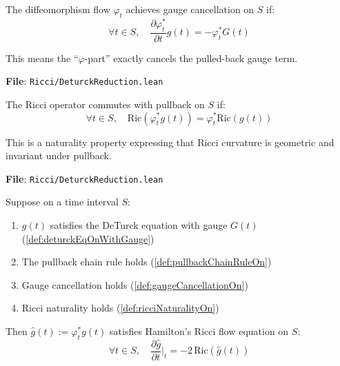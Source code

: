 \begin{definition}
\label{def:gaugeCancellationOn}
The diffeomorphism flow $\varphi_t$ achieves gauge cancellation on $S$ if:
\[ \forall t \in S, \quad \frac{\partial \varphi_t^*}{\partial t}g(t) = -\varphi_t^* G(t) \]

This means the ``$\varphi$-part'' exactly cancels the pulled-back gauge term.

\textbf{File}: \texttt{Ricci/DeturckReduction.lean}
\end{definition}

\begin{definition}
\label{def:ricciNaturalityOn}
The Ricci operator commutes with pullback on $S$ if:
\[ \forall t \in S, \quad \mathrm{Ric}(\varphi_t^* g(t)) = \varphi_t^* \mathrm{Ric}(g(t)) \]

This is a naturality property expressing that Ricci curvature is geometric and invariant under pullback.

\textbf{File}: \texttt{Ricci/DeturckReduction.lean}
\end{definition}

\begin{theorem}
\label{thm:deturck_to_hamilton}
\leanok
{}
Suppose on a time interval $S$:
\begin{enumerate}
\item $g(t)$ satisfies the DeTurck equation with gauge $G(t)$ (\ref{def:deturckEqOnWithGauge})
\item The pullback chain rule holds (\ref{def:pullbackChainRuleOn})
\item Gauge cancellation holds (\ref{def:gaugeCancellationOn})
\item Ricci naturality holds (\ref{def:ricciNaturalityOn})
\end{enumerate}

Then $\hat{g}(t) := \varphi_t^* g(t)$ satisfies Hamilton's Ricci flow equation on $S$:
\[ \forall t \in S, \quad \frac{\partial \hat{g}}{\partial t}\Big|_t = -2 \, \mathrm{Ric}(\hat{g}(t)) \]
\end{theorem}

